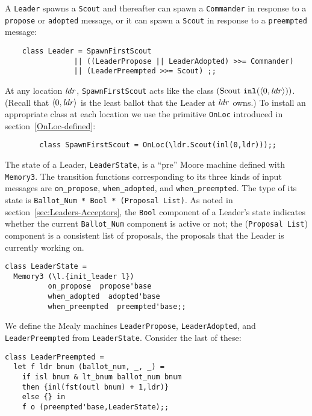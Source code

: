 \documentclass[final]{article}
\newcommand{\listinline}[1]{\text{\lstinline{#1}}}
\begin{document}
A \lstinline{Leader} spawns a \lstinline{Scout} and thereafter can
spawn a \lstinline{Commander} in response to a \lstinline{propose} or
\lstinline{adopted} message, or it can spawn a \lstinline{Scout} in
response to a \lstinline{preempted} message:

\newpage
\begin{lstlisting}
    class Leader = SpawnFirstScout
                || ((LeaderPropose || LeaderAdopted) >>= Commander)
                || (LeaderPreempted >>= Scout) ;;
\end{lstlisting}

At any location $\mathit{ldr}$, \lstinline{SpawnFirstScout} acts like
the class
$(\listinline{Scout}~\NUPRLinlSYMB(\NUPRLpair{0}{\NUPRL{ldr}}))$.
(Recall that $\langle0,\mathit{ldr}\rangle$ is the least ballot that the
Leader at $\mathit{ldr}$ owns.)  To install an appropriate class at
each location we use the primitive \lstinline{OnLoc} introduced in
section~\ref{OnLoc-defined}:
\begin{lstlisting}
        class SpawnFirstScout = OnLoc(\ldr.Scout(inl(0,ldr)));;
\end{lstlisting}

\vspace{1.0ex}
%
The state of a Leader, \lstinline{LeaderState}, is a ``pre'' Moore
machine defined with \lstinline{Memory3}.  The transition functions
corresponding to its three kinds of input messages are
\lstinline{on_propose}, \lstinline{when_adopted}, and
\lstinline{when_preempted}.  The type of its state is
\lstinline{Ballot_Num * Bool * (Proposal List)}.  As noted in
section~\ref{sec:Leaders-Acceptors}, the \lstinline{Bool} component of
a Leader's state indicates whether the current \lstinline{Ballot_Num}
component is active or not; the (\lstinline{Proposal List}) component is
a consistent list of proposals, the proposals that the Leader is
currently working on.

\begin{lstlisting}
class LeaderState =
  Memory3 (\l.{init_leader l})
          on_propose  propose'base
          when_adopted  adopted'base
          when_preempted  preempted'base;;
\end{lstlisting}

We define the Mealy machines \lstinline{LeaderPropose},
\lstinline{LeaderAdopted}, and \lstinline{LeaderPreempted} from
\lstinline{LeaderState}.  Consider the last of these:
\begin{lstlisting}
class LeaderPreempted =
  let f ldr bnum (ballot_num, _, _) =
    if isl bnum & lt_bnum ballot_num bnum
    then {inl(fst(outl bnum) + 1,ldr)}
    else {} in
    f o (preempted'base,LeaderState);;
\end{lstlisting}
\end{document}
